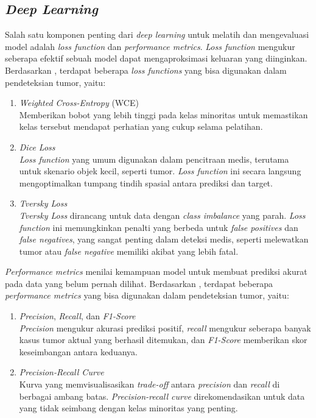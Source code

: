 \subsection{\textit{Deep Learning}}
Salah satu komponen penting dari \textit{deep learning} untuk melatih dan mengevaluasi model adalah \textit{loss function} dan \textit{performance metrics}. \textit{Loss function} mengukur seberapa efektif sebuah model dapat mengaproksimasi keluaran yang diinginkan. Berdasarkan \textcite{terven2025survey}, terdapat beberapa \textit{loss functions} yang bisa digunakan dalam pendeteksian tumor, yaitu:

\begin{enumerate}
	\item \textit{Weighted Cross-Entropy} (WCE) \\
	Memberikan bobot yang lebih tinggi pada kelas minoritas untuk memastikan kelas tersebut mendapat perhatian yang cukup selama pelatihan.
	\item \textit{Dice Loss} \\
	\textit{Loss function} yang umum digunakan dalam pencitraan medis, terutama untuk skenario objek kecil, seperti tumor. \textit{Loss function} ini secara langsung mengoptimalkan tumpang tindih spasial antara prediksi dan target.
	\item \textit{Tversky Loss} \\
	\textit{Tversky Loss} dirancang untuk data dengan \textit{class imbalance} yang parah. \textit{Loss function} ini memungkinkan penalti yang berbeda untuk \textit{false positives} dan \textit{false negatives}, yang sangat penting dalam deteksi medis, seperti melewatkan tumor atau \textit{false negative} memiliki akibat yang lebih fatal.
	
\end{enumerate}

\textit{Performance metrics} menilai kemampuan model untuk membuat prediksi akurat pada data yang belum pernah dilihat. Berdasarkan \textcite{terven2025survey}, terdapat beberapa \textit{performance metrics} yang bisa digunakan dalam pendeteksian tumor, yaitu:

\begin{enumerate}
	\item \textit{Precision}, \textit{Recall}, dan \textit{F1-Score} \\
	\textit{Precision} mengukur akurasi prediksi positif, \textit{recall} mengukur seberapa banyak kasus tumor aktual yang berhasil ditemukan, dan \textit{F1-Score} memberikan skor keseimbangan antara keduanya.
	\item \textit{Precision-Recall Curve} \\
	Kurva yang memvisualisasikan \textit{trade-off} antara \textit{precision} dan \textit{recall} di berbagai ambang batas. \textit{Precision-recall curve} direkomendasikan untuk data yang tidak seimbang dengan kelas minoritas yang penting.
\end{enumerate}

